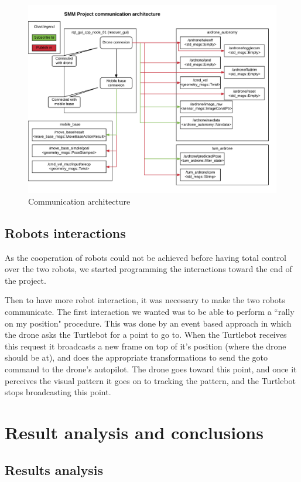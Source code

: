 \documentclass[11pt,a4paper,twocolumn]{article}
\begin{document}
\begin{figure}[ht]	
\centering
\includegraphics[width=\textwidth]{communicationArchitecture.png}
\caption{Communication architecture}
\end{figure}

\subsection{Robots interactions}
As the cooperation of robots could not be achieved before having total control over the two robots, 
we started programming the interactions toward the end of the project.

Then to have more robot interaction, it was necessary to make the two robots communicate.
The first interaction we wanted was to be able to perform a ``rally on my position" procedure.
This was done by an event based approach in which the drone asks the Turtlebot for a point to go to. When the Turtlebot receives this request it broadcasts a new frame on top of it's position (where the drone should be at), and does the appropriate transformations to send the goto command to the drone's autopilot. The drone goes toward this point, and once it perceives the visual pattern it goes on to tracking the pattern, and the Turtlebot stops broadcasting this point.



\section{Result analysis and conclusions}
\subsection{Results analysis}
\end{document}
